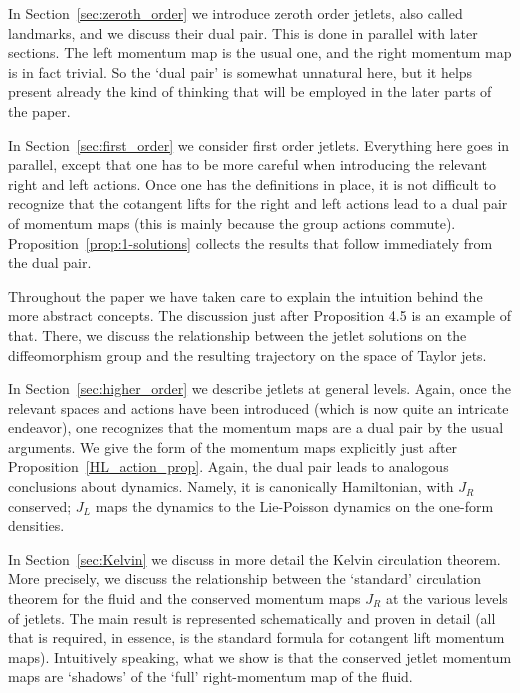 \documentclass[12pt]{amsart}
\begin{document}
In Section~\ref{sec:zeroth_order} we introduce zeroth order jetlets, also called landmarks, and we discuss their dual pair. This is done in parallel with later sections. The left momentum map is the usual one, and the right momentum map is in fact trivial. So the `dual pair' is somewhat unnatural here, but it helps present already the kind of thinking that will be employed in the later parts of the paper. 
%

In Section~\ref{sec:first_order} we consider first order jetlets. Everything here goes in parallel, except that one has to be more careful when introducing the relevant right and left actions. Once one has the definitions in place, it is not difficult to recognize that the cotangent lifts for the right and left actions lead to a dual pair of momentum maps (this is mainly because the group actions commute).  Proposition~\ref{prop:1-solutions} collects the results that follow immediately from the dual pair.

Throughout the paper we have taken care to explain the intuition behind the more abstract concepts. The discussion just after Proposition 4.5 is an example of that. There, we discuss the relationship between the jetlet solutions on the diffeomorphism group and the resulting trajectory on the space of Taylor jets. 

In Section~\ref{sec:higher_order} we describe jetlets at general levels. Again, once the relevant spaces and actions have been introduced (which is now quite an intricate endeavor), one recognizes that the momentum maps are a dual pair by the usual arguments. We give the form of the momentum maps explicitly just after Proposition~\ref{HL_action_prop}. Again, the dual pair leads to analogous conclusions about dynamics. Namely, it is canonically Hamiltonian, with $J_R$  conserved; $J_L$ maps the dynamics to the Lie-Poisson dynamics on the one-form densities.

In Section~\ref{sec:Kelvin} we discuss in more detail the Kelvin circulation theorem. More precisely, we discuss the relationship between the `standard' circulation theorem for the fluid and the conserved momentum maps $J_R$  at the various levels of jetlets. The main result is represented schematically and proven in detail (all that is required, in essence, is the standard formula for cotangent lift momentum maps). Intuitively speaking, what we show is that the conserved jetlet momentum maps are `shadows' of the `full' right-momentum map of the fluid.\\
\end{document}

